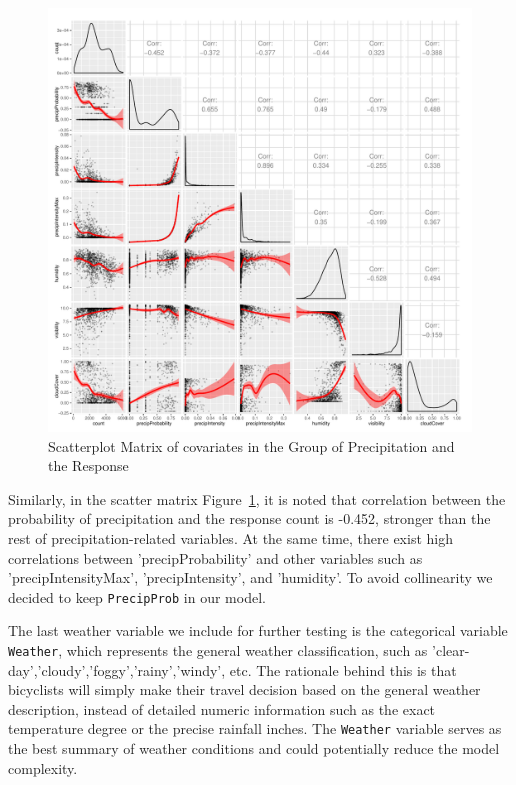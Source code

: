 \documentclass [11pt, proquest] {uwthesis}[2015/03/03]
\begin{document}
\begin{figure}
   \includegraphics[width=1\textwidth]{figures/matrix1}
  \caption{Scatterplot Matrix of covariates in the Group of Precipitation and the Response}
  \label{fig:precip_corr}
\end{figure}

Similarly, in the scatter matrix Figure~\ref{fig:precip_corr}, it is noted that correlation between the probability of precipitation and the response count is -0.452, stronger than the rest of precipitation-related variables. At the same time, there exist high correlations between 'precipProbability' and other variables such as 'precipIntensityMax', 'precipIntensity', and 'humidity'. To avoid collinearity we decided to keep \texttt{PrecipProb} in our model.

The last weather variable we include for further testing is the categorical variable \texttt{Weather}, which represents the general weather classification, such as 'clear-day','cloudy','foggy','rainy','windy', etc. The rationale behind this is that bicyclists will simply make their travel decision based on the general weather description, instead of detailed numeric information such as the exact temperature degree or the precise rainfall inches. The \texttt{Weather} variable serves as the best summary of weather conditions and could potentially reduce the model complexity.
\end{document}

